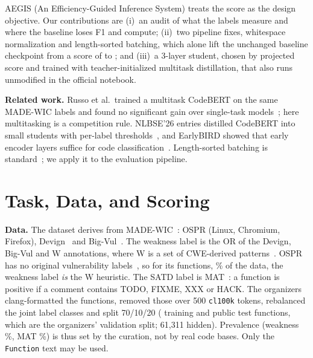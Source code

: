 \documentclass[10pt,conference]{IEEEtran}
\begin{document}
AEGIS (An Efficiency-Guided Inference System) treats the score as the design objective. Our contributions are
(i)~an audit of what the labels measure and where the baseline loses F1 and compute; (ii)~two pipeline fixes,
whitespace normalization and length-sorted batching, which alone lift the unchanged baseline checkpoint from a
score of \BaseScoreLocal{} to \BaseSortedScore{}; and (iii)~a 3-layer student, chosen by projected score and
trained with teacher-initialized multitask distillation, that also runs unmodified in the official notebook.

\textbf{Related work.} Russo et al.\ trained a multitask CodeBERT on the same MADE-WIC labels and found no
significant gain over single-task models~\cite{russo2025vulsatd}; here multitasking is a competition rule. NLBSE'26
entries distilled CodeBERT into small students with per-label thresholds~\cite{shah2026tracc,majeed2026kd}, and
EarlyBIRD showed that early encoder layers suffice for code classification~\cite{grishina2023earlybird}.
Length-sorted batching is standard~\cite{ott2019fairseq}; we apply it to the evaluation pipeline.

\section{Task, Data, and Scoring}
\label{sec:task}
\textbf{Data.} The dataset derives from MADE-WIC~\cite{mock2024madewic}: OSPR (Linux, Chromium, Firefox),
Devign~\cite{zhou2019devign} and Big-Vul~\cite{fan2020bigvul}. The weakness label is the OR of the Devign,
Big-Vul and W annotations, where W is a set of CWE-derived patterns~\cite{russo2022weaksatd}. OSPR has no original
vulnerability labels~\cite{mock2024madewic}, so for its functions, \SrcOsprShare\% of the data, the weakness label
\emph{is} the W heuristic. The SATD label is MAT~\cite{guo2021mat}: a function is positive if a comment contains
TODO, FIXME, XXX or HACK. The organizers clang-formatted the functions, removed those over 500 \texttt{cl100k}
tokens, rebalanced the joint label classes and split 70/10/20 (\TrainN{} training and \TestN{} public test
functions, which are the organizers' validation split; 61{,}311 hidden). Prevalence (weakness \VulnPrev\%, MAT
\MatPrev\%) is thus set by the curation, not by real code bases. Only the \texttt{Function} text may be used.
\end{document}
